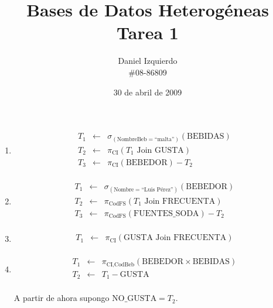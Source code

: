 \documentclass[12pt]{article}
\newcommand{\asig}{\ensuremath{\leftarrow}}
\begin{document}

\title{Bases de Datos Heterogéneas \\ Tarea 1}
\author{Daniel Izquierdo \\ \#08-86809}
\date{30 de abril de 2009}

\maketitle

\begin{enumerate}

 \item

\begin{eqnarray*}
 T_1 & \asig & \sigma_{(\text{NombreBeb}=\text{``malta''})}(\text{BEBIDAS}) \\
 T_2 & \asig & \pi_{\text{CI}}(T_1 \text{ Join } \text{GUSTA}) \\
 T_3 & \asig & \pi_{\text{CI}}(\text{BEBEDOR}) - T_2 \\
\end{eqnarray*}

 \item

\begin{eqnarray*}
 T_1 & \asig & \sigma_{(\text{Nombre}=\text{``Luis Pérez''})}(\text{BEBEDOR}) \\
 T_2 & \asig & \pi_{\text{CodFS}}(T_1 \text{ Join } \text{FRECUENTA}) \\
 T_3 & \asig & \pi_{\text{CodFS}}(\text{FUENTES\_SODA}) - T_2 \\
\end{eqnarray*}

 \item

\begin{eqnarray*}
 T_1 & \asig & \pi_{\text{CI}}(\text{GUSTA} \text{ Join } \text{FRECUENTA}) \\
\end{eqnarray*}

 \item

\begin{eqnarray*}
 T_1 & \asig & \pi_{\text{CI,CodBeb}}(\text{BEBEDOR} \times \text{BEBIDAS}) \\
 T_2 & \asig & T_1 - \text{GUSTA} \\
\end{eqnarray*}

A partir de ahora supongo $\text{NO\_GUSTA} = T_2$.


\end{enumerate}
\end{document}
